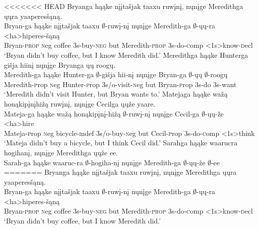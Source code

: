 \documentclass[output=paper]{LSP/langsci}
\begin{document}
\begin{exe}
\ex
\begin{xlist}
\ex
<<<<<<< HEAD
\glll Bryanga hąąke {nįįtašjak taaxu} ruwįnį, nųnįge Meredithga ųųra yaaperesšąną.\\
Bryan-ga hąąke {nįįtašjak taaxu} $\emptyset$-ruwį-nį nųnįge Meredith-ga $\emptyset$-ųų-ra <ha>hiperes-šąną\\
Bryan-\textsc{prop} {\textsc neg} coffee {\textsc 3s}-buy-\textsc{neg} but Meredith-\textsc{prop} {\textsc 3s}-do-{\textsc comp} <{\textsc 1s}>know-{\textsc decl}\\
\trans `Bryan didn't buy coffee, but I know Meredith did.'
\ex
\glll Meredithga hąąke Hunterga {gišja hiinį} nųnįge Bryanga ųų roogų.\\
Meredith-ga hąąke Hunter-ga $\emptyset$-{gišja hii-nį} nųnįge Bryan-ga $\emptyset$-ųų $\emptyset$-roogų\\
Meredith-{\textsc prop} {\textsc neg} Hunter-{\textsc prop} {\textsc 3s/o}-visit-{\textsc neg} but Bryan-{\textsc prop} {\textsc 3s}-do {\textsc 3s}-want\\
\trans `Meredith didn't visit Hunter, but Bryan wants to.'
\ex
\glll Matejaga hąąke {wažą honąkipįnįhižą} ruwįnį, nųnįge Cecilga ųųže yaare.\\
Mateja-ga hąąke {wažą honąkipįnį-hižą} $\emptyset$-ruwį-nį nųnįge Cecil-ga $\emptyset$-ųų-že <ha>hire\\
Mateja-{\textsc prop} {\textsc neg} bicycle-{\textsc indef} {\textsc 3s/o}-buy-{\textsc neg} but Cecil-{\textsc prop} {\textsc 3s}-do-{\textsc comp} <{\textsc 1s}>think\\
\trans `Mateja didn't buy a bicycle, but I think Cecil did.'
\ex
\glll Sarahga hąąke waarucra hogihanį, nųnįge Meredithga ųųže ee.\\
Sarah-ga hąąke waaruc-ra $\emptyset$-hogiha-nį nųnįge Meredith-ga $\emptyset$-ųų-že $\emptyset$-ee\\
=======
\glll Bryanga h\k{a}\k{a}ke {n\k{i}\k{i}ta\v{s}jak taaxu} ruw\k{i}n\k{i}, n\k{u}n\k{i}ge Meredithga \k{u}\k{u}ra yaaperes\v{s}\k{a}n\k{a}.\\
Bryan-ga h\k{a}\k{a}ke {n\k{i}\k{i}ta\v{s}jak taaxu} $\emptyset$-ruw\k{i}-n\k{i} n\k{u}n\k{i}ge Meredith-ga $\emptyset$-\k{u}\k{u}-ra <ha>hiperes-\v{s}\k{a}n\k{a}\\
Bryan-\textsc{prop} {\textsc neg} coffee {\textsc 3s}-buy-\textsc{neg} but Meredith-\textsc{prop} {\textsc 3s}-do-{\textsc comp} <{\textsc 1s}>know-{\textsc decl}\\
\trans `Bryan didn't buy coffee, but I know Meredith did.'

\end{xlist}
\end{exe}
\end{document}
